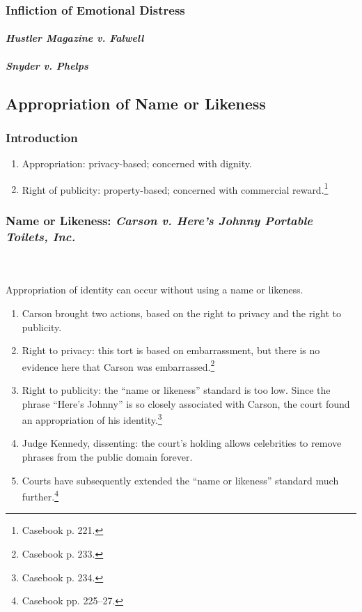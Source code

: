 
\subsubsection{Infliction of Emotional Distress}

\paragraph{\emph{Hustler Magazine v. Falwell}}


\paragraph{\emph{Snyder v. Phelps}}


\subsection{Appropriation of Name or Likeness}

\subsubsection{Introduction}

\begin{enumerate}
    \item Appropriation: privacy-based; concerned with dignity.
    \item Right of publicity: property-based; concerned with commercial 
    reward.\footnote{Casebook p. 221.}
\end{enumerate}

\subsubsection{Name or Likeness: \emph{Carson v. Here's Johnny Portable Toilets, 
Inc.}}
~\\\\
Appropriation of identity can occur without using a name or likeness.

\begin{enumerate}
    \item Carson brought two actions, based on the right to privacy and the 
    right to publicity.
    \item Right to privacy: this tort is based on embarrassment, but there is no 
    evidence here that Carson was embarrassed.\footnote{Casebook p. 233.}
    \item Right to publicity: the ``name or likeness'' standard is too low. 
    Since the phrase ``Here's Johnny'' is so closely associated with Carson, the 
    court found an appropriation of his identity.\footnote{Casebook p. 234.}
    \item Judge Kennedy, dissenting: the court's holding allows celebrities to 
    remove phrases from the public domain forever.
    \item Courts have subsequently extended the ``name or likeness'' standard 
    much further.\footnote{Casebook pp. 225--27.}
\end{enumerate}

